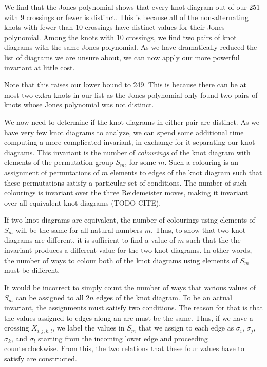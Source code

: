 \begin{paper}

We find that the Jones polynomial shows that every knot diagram out of our 251
with 9 crossings or fewer is distinct.
This is because all of the non-alternating knots with fewer than 10 crossings
have distinct values for their Jones polynomial.
Among the knots with 10 crossings, we find two pairs of knot diagrams with the
same Jones polynomial.
As we have dramatically reduced the list of diagrams we are unsure about, we can
now apply our more powerful invariant at little cost.

Note that this raises our lower bound to 249.
This is because there can be at most two extra knots in our list as the Jones
polynomial only found two pairs of knots whose Jones polynomial was not
distinct.


We now need to determine if the knot diagrams in either pair are distinct.
As we have very few knot diagrams to analyze, we can spend some additional time
computing a more complicated invariant, in exchange for it separating our knot
diagrams.
This invariant is the number of \textit{colourings} of the knot diagram with
elements of the permutation group $S_m$, for some $m$.
Such a colouring is an assignment of permutations of $m$ elements to edges of
the knot diagram such that these permutations satisfy a particular set of
conditions.
The number of such colourings is invariant over the three Reidemeister moves,
making it invariant over all equivalent knot diagrams (TODO CITE).

If two knot diagrams are equivalent, the number of colourings using elements of
$S_m$ will be the same for all natural numbers $m$.
Thus, to show that two knot diagrams are different, it is sufficient to find a
value of $m$ such that the the invariant produces a different value for the two
knot diagrams.
In other words, the number of ways to colour both of the knot diagrams using
elements of $S_m$ must be different.

It would be incorrect to simply count the number of ways that various values of
$S_m$ can be assigned to all $2n$ edges of the knot diagram.
To be an actual invariant, the assignments must satisfy two conditions.
The reason for that is that the values assigned to edges along an arc must be
the same.
Thus, if we have a crossing $X_{i,j,k,l}$, we label the values in $S_m$ that we
assign to each edge as $\sigma_i$, $\sigma_j$, $\sigma_k$, and $\sigma_l$
starting from the incoming lower edge and proceeding counterclockwise.
From this, the two relations that these four values have to satisfy are
constructed.


\end{paper}
